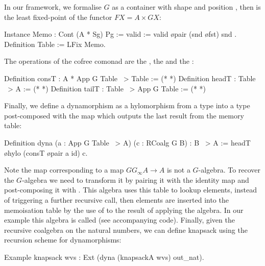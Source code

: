 \documentclass[a4paper,UKenglish,cleveref, autoref, thm-restate]{lipics-v2021}
\begin{document}
In our framework, we formalise $G$ as a container with shape  and
position , then  is the least fixed-point of the functor
$F X = A \times GX$:
\begin{coqcode}
Instance Memo : Cont (A * Sg) Pg := { valid := valid \o pair (snd \o fst) snd }.
Definition Table := LFix Memo.
\end{coqcode}
The operations of the cofree comonad  are the , the  and the :
\begin{coqcode}
Definition consT : A * App G Table ~> Table := (* *)
Definition headT : Table ~> A := (* *)
Definition tailT : Table ~> App G Table := (* *)
\end{coqcode}
Finally, we define a dynamorphism as a hylomorphism from a type  into a
type  post-composed with the  map which outputs the last
result from the memory table:
\begin{coqcode}
Definition dyna (a : App G Table ~> A) (c : RCoalg G B) : B ~> A
  := headT \o hylo (consT \o pair a id) c.
\end{coqcode}
Note the map  corresponding to a map $G G_{\infty}A \to A$
is not a $G$-algebra.  To recover the $G$-algebra we need to transform it by pairing it with the identity map and
post-composing it with . This algebra uses this table to lookup
elements, instead of triggering a further recursive call, then elements are
inserted into the memoisation table by the use of  to the result of
applying the algebra. In our example this algebra is called  (see
accompanying code).
Finally, given the recursive coalgebra  on the natural numbers, we
can define knapsack using the recursion scheme for dynamorphisms:
\begin{coqcode}
Example knapsack wvs : Ext (dyna (knapsackA wvs) out_nat).
\end{coqcode}
\end{document}
